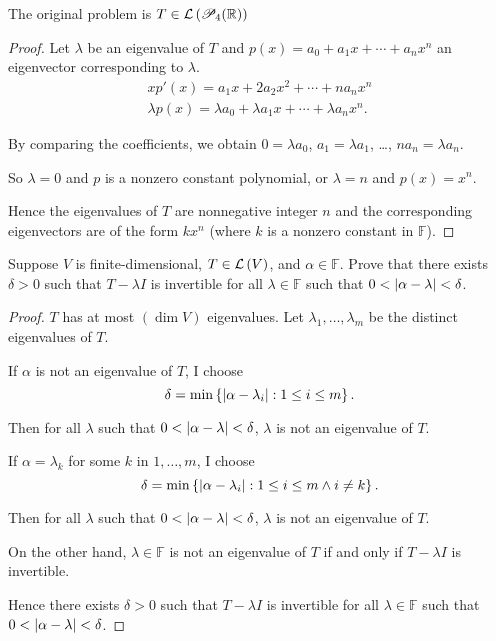 The original problem is $T\in\mathcal{L}\left({\mathscr{P}_{4}(\mathbb{R})}\right)$

\begin{proof}
    Let $\lambda$ be an eigenvalue of $T$ and $p(x) = a_{0} + a_{1}x + \cdots + a_{n}x^{n}$ an eigenvector corresponding to $\lambda$.
    \[
        \begin{split}
            xp'(x) = a_{1}x + 2a_{2}x^{2} + \cdots + na_{n}x^{n} \\
            \lambda p(x) = \lambda a_{0} + \lambda a_{1}x + \cdots + \lambda a_{n}x^{n}.
        \end{split}
    \]

    By comparing the coefficients, we obtain $0 = \lambda a_{0}$, $a_{1} = \lambda a_{1}$, \ldots, $na_{n} = \lambda a_{n}$.

    So $\lambda = 0$ and $p$ is a nonzero constant polynomial, or $\lambda = n$ and $p(x) = x^{n}$.

    Hence the eigenvalues of $T$ are nonnegative integer $n$ and the corresponding eigenvectors are of the form $kx^{n}$ (where $k$ is a nonzero constant in $\mathbb{F}$).
\end{proof}
\newpage

\begin{exercise}\label{chapter5:sectionA:exercise11}
    Suppose $V$ is finite-dimensional, $T\in\mathcal{L}\left({V}\right)$, and $\alpha\in\mathbb{F}$. Prove that there exists $\delta > 0$ such that $T - \lambda I$ is invertible for all $\lambda\in\mathbb{F}$ such that $0 < \left\vert{\alpha - \lambda}\right\vert < \delta$.
\end{exercise}

\begin{proof}
    $T$ has at most $(\dim V)$ eigenvalues. Let $\lambda_{1}, \ldots, \lambda_{m}$ be the distinct eigenvalues of $T$.

    If $\alpha$ is not an eigenvalue of $T$, I choose
    \[
        \delta = \min\left\{ \left\vert{\alpha - \lambda_{i}}\right\vert: 1\leq i\leq m \right\}.
    \]

    Then for all $\lambda$ such that $0 < \left\vert{\alpha - \lambda}\right\vert < \delta$, $\lambda$ is not an eigenvalue of $T$.

    If $\alpha = \lambda_{k}$ for some $k$ in $1, \ldots, m$, I choose
    \[
        \delta = \min\left\{ \left\vert{\alpha - \lambda_{i}}\right\vert: 1\leq i\leq m\wedge i\ne k \right\}.
    \]

    Then for all $\lambda$ such that $0 < \left\vert{\alpha - \lambda}\right\vert < \delta$, $\lambda$ is not an eigenvalue of $T$.

    On the other hand, $\lambda\in\mathbb{F}$ is not an eigenvalue of $T$ if and only if $T - \lambda I$ is invertible.

    Hence there exists $\delta > 0$ such that $T - \lambda I$ is invertible for all $\lambda\in\mathbb{F}$ such that $0 < \left\vert{\alpha - \lambda}\right\vert < \delta$.
\end{proof}
\newpage

